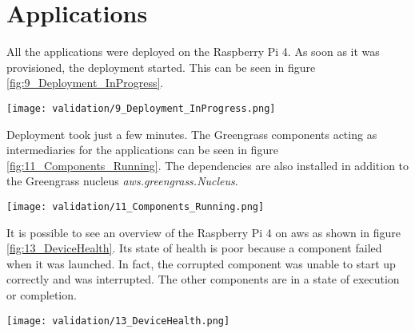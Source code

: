 \section{Applications}

All the applications were deployed on the Raspberry Pi 4. As soon as it was provisioned, the deployment started. This can be seen in figure \ref{fig:9_Deployment_InProgress}.
\begin{center}
    \begingroup
    \texttt{[image: validation/9\_Deployment\_InProgress.png]}
    \label{fig:9_Deployment_InProgress}
    \endgroup
\end{center}
Deployment took just a few minutes. The Greengrass components acting as intermediaries for the applications can be seen in figure \ref{fig:11_Components_Running}. The dependencies are also installed in addition to the Greengrass nucleus \textit{aws.greengrass.Nucleus}.
\begin{center}
    \begingroup
    \texttt{[image: validation/11\_Components\_Running.png]}
    \label{fig:11_Components_Running}
    \endgroup
\end{center}
It is possible to see an overview of the Raspberry Pi 4 on \gls{aws} as shown in figure \ref{fig:13_DeviceHealth}. Its state of health is poor because a component failed when it was launched. In fact, the corrupted component was unable to start up correctly and was interrupted. The other components are in a state of execution or completion.
\begin{center}
    \begingroup
    \texttt{[image: validation/13\_DeviceHealth.png]}
    \label{fig:13_DeviceHealth}
    \endgroup
\end{center}

